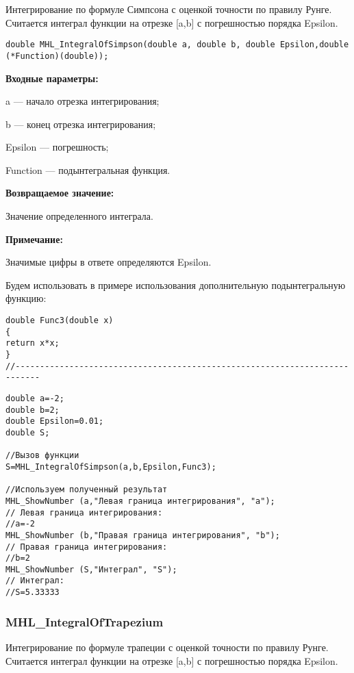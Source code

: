 \documentclass[a4paper,12pt]{article}
\begin{document}
Интегрирование по формуле Симпсона с оценкой точности по правилу Рунге. Считается интеграл функции на отрезке [a,b] с погрешностью порядка Epsilon.


\begin{lstlisting}[label=code_syntax_MHL_IntegralOfSimpson,caption=Синтаксис]
double MHL_IntegralOfSimpson(double a, double b, double Epsilon,double (*Function)(double));
\end{lstlisting}

\textbf{Входные параметры:}

 a --- начало отрезка интегрирования;
 
 b --- конец отрезка интегрирования;
 
 Epsilon --- погрешность;
 
 Function --- подынтегральная функция.

\textbf{Возвращаемое значение:}
 
 Значение определенного интеграла.
 
 \textbf{Примечание:}
 
 Значимые цифры в ответе определяются Epsilon.

Будем использовать в примере использования дополнительную подынтегральную функцию:

\begin{lstlisting}[caption=Дополнительная функция]
double Func3(double x)
{
return x*x;
}
//---------------------------------------------------------------------------
\end{lstlisting}


\begin{lstlisting}[label=code_use_MHL_IntegralOfSimpson,caption=Пример использования]
double a=-2;
double b=2;
double Epsilon=0.01;
double S;

//Вызов функции
S=MHL_IntegralOfSimpson(a,b,Epsilon,Func3);

//Используем полученный результат
MHL_ShowNumber (a,"Левая граница интегрирования", "a");
// Левая граница интегрирования:
//a=-2
MHL_ShowNumber (b,"Правая граница интегрирования", "b");
// Правая граница интегрирования:
//b=2
MHL_ShowNumber (S,"Интеграл", "S");
// Интеграл:
//S=5.33333
\end{lstlisting}

\subsubsection{MHL\_IntegralOfTrapezium}\label{MHL_IntegralOfTrapezium}

Интегрирование по формуле трапеции с оценкой точности по правилу Рунге. Считается интеграл функции на отрезке [a,b] с погрешностью порядка Epsilon.
\end{document}
